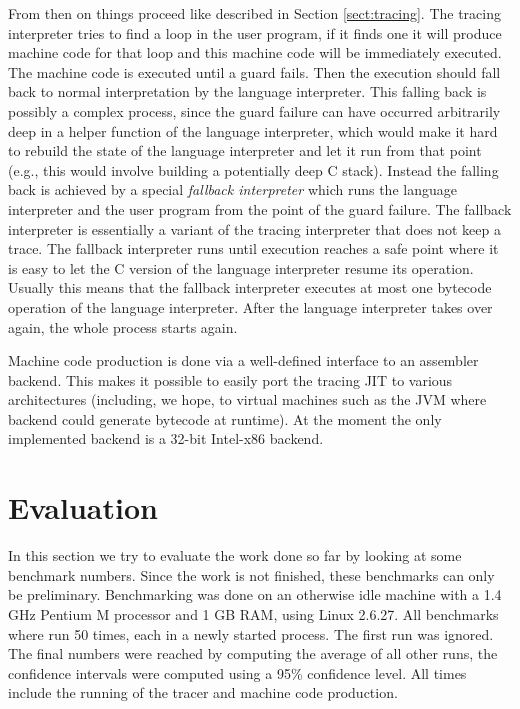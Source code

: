 \documentclass{sig-alternate}
\newcommand\eg{e.g.,\xspace}
\begin{document}
From then on things proceed like described in Section \ref{sect:tracing}. The
tracing interpreter tries to find a loop in the user program, if it finds one it
will produce machine code for that loop and this machine code will be
immediately executed. The machine code is executed until a guard fails. Then the
execution should fall back to normal interpretation by the language interpreter.
This falling back is possibly a complex process, since the guard failure can
have occurred arbitrarily deep in a helper function of the language interpreter,
which would make it hard to rebuild the state of the language interpreter and
let it run from that point (\eg this would involve building a potentially deep
C stack). Instead the falling back is achieved by a special \emph{fallback
interpreter} which runs the language interpreter and the user program from the
point of the guard failure. The fallback interpreter is essentially a variant of
the tracing interpreter that does not keep a trace. The fallback interpreter
runs until execution reaches a safe point where it is easy to let the C version
of the language interpreter resume its operation. Usually this means that the
fallback interpreter executes at most one bytecode operation of the language
interpreter. After the language interpreter takes over again, the whole process
starts again.

Machine code production is done via a well-defined interface to an assembler
backend. This makes it possible to easily port the tracing JIT to various
architectures (including, we hope, to virtual machines such as the JVM where
backend could generate bytecode at runtime). At the moment the only implemented
backend is a 32-bit Intel-x86 backend.


\section{Evaluation}
\label{sect:evaluation}

In this section we try to evaluate the work done so far by looking at some
benchmark numbers. Since the work is not finished, these benchmarks can only be
preliminary. Benchmarking was done on an otherwise idle machine with a 1.4
GHz Pentium M processor and 1 GB RAM, using Linux 2.6.27. All benchmarks where
run 50 times, each in a newly started process. The first run was ignored. The
final numbers were reached by computing the average of all other runs, the
confidence intervals were computed using a 95\% confidence level. All times
include the running of the tracer and machine code production.
\end{document}
